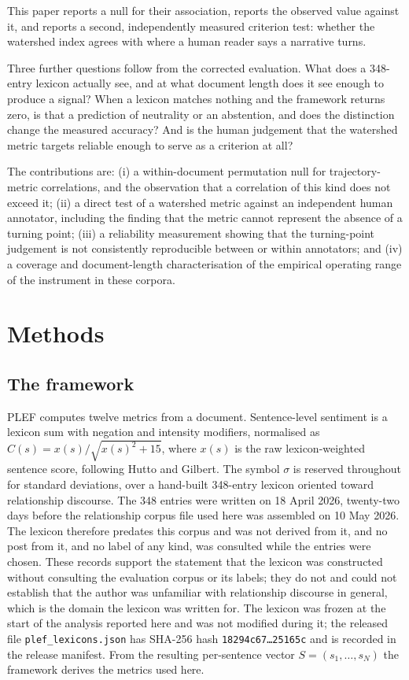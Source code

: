 \documentclass[fleqn,10pt]{wlscirep}
\begin{document}
This paper reports a null for their association, reports the observed value against it, and reports a second, independently measured criterion test: whether the watershed index agrees with where a human reader says a narrative turns.

Three further questions follow from the corrected evaluation. What does a 348-entry lexicon actually see, and at what document length does it see enough to produce a signal? When a lexicon matches nothing and the framework returns zero, is that a prediction of neutrality or an abstention, and does the distinction change the measured accuracy? And is the human judgement that the watershed metric targets reliable enough to serve as a criterion at all?

The contributions are: (i) a within-document permutation null for trajectory-metric correlations, and the observation that a correlation of this kind does not exceed it; (ii) a direct test of a watershed metric against an independent human annotator, including the finding that the metric cannot represent the absence of a turning point; (iii) a reliability measurement showing that the turning-point judgement is not consistently reproducible between or within annotators; and (iv) a coverage and document-length characterisation of the empirical operating range of the instrument in these corpora.

\section{Methods}\label{sec:methods}

\subsection{The framework}\label{subsec:framework}

PLEF computes twelve metrics from a document. Sentence-level sentiment is a lexicon sum with negation and intensity modifiers, normalised as $C(s) = x(s)/\sqrt{x(s)^2+15}$, where $x(s)$ is the raw lexicon-weighted sentence score, following Hutto and Gilbert\cite{hutto2014}. The symbol $\sigma$ is reserved throughout for standard deviations, over a hand-built 348-entry lexicon oriented toward relationship discourse. The 348 entries were written on 18 April 2026, twenty-two days before the relationship corpus file used here was assembled on 10 May 2026. The lexicon therefore predates this corpus and was not derived from it, and no post from it, and no label of any kind, was consulted while the entries were chosen. These records support the statement that the lexicon was constructed without consulting the evaluation corpus or its labels; they do not and could not establish that the author was unfamiliar with relationship discourse in general, which is the domain the lexicon was written for. The lexicon was frozen at the start of the analysis reported here and was not modified during it; the released file \texttt{plef\_lexicons.json} has SHA-256 hash \texttt{18294c67\dots25165c} and is recorded in the release manifest. From the resulting per-sentence vector $S=(s_1,\dots,s_N)$ the framework derives the metrics used here.
\end{document}

